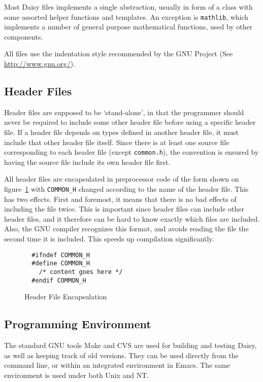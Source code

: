 \documentclass{article}
\newcommand{\code}[1]{\texttt{#1}}
\newcommand{\file}[1]{\texttt{#1}}
\begin{document}
Most Daisy files implements a single abstraction, usually in form of a
class with some assorted helper functions and templates.  An exception
is \file{mathlib}, which implements a number of general purpose
mathematical functions, used by other components.

All files use the indentation style recommended by the GNU Project
(See \url{http://www.gnu.org/}).

\subsection{Header Files}

Header files are supposed to be `stand-alone', in that the programmer
should never be required to include some other header file before
using a specific header file.  If a header file depends on types
defined in another header file, it must include that other header file
itself.  Since there is at least one source file corresponding to each
header file (except \file{common.h}), the convention is ensured by
having the source file include its own header file first.

All header files are encapsulated in preprocessor code of the form
shown on figure~\ref{fig:header} with \code{COMMON\_H} changed
according to the name of the header file.  This has two effects.
First and foremost, it means that there is no bad effects of including
the file twice.  This is important since header files can include
other header files, and it therefore can be hard to know exactly which
files are included.  Also, the GNU compiler recognizes this format,
and avoids reading the file the second time it is included.  This
speeds up compilation significantly.

\begin{figure}[htbp]
\begin{verbatim}
  #ifndef COMMON_H
  #define COMMON_H
    /* content goes here */
  #endif COMMON_H
\end{verbatim}
  \caption{Header File Encapsulation}
  \label{fig:header}
\end{figure}

\subsection{Programming Environment}

The standard GNU tools Make and CVS are used for building and testing
Daisy, as well as keeping track of old versions.  They can be used
directly from the command line, or within an integrated environment in
Emacs.  The same environment is used under both Unix and NT.
\end{document}
